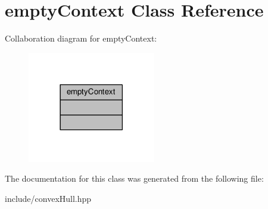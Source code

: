 \hypertarget{classempty_context}{}\section{empty\+Context Class Reference}
\label{classempty_context}


Collaboration diagram for empty\+Context\+:
\nopagebreak
\begin{figure}[H]
\begin{center}
\leavevmode
\includegraphics[width=158pt]{classempty_context__coll__graph}
\end{center}
\end{figure}


The documentation for this class was generated from the following file\+:\begin{DoxyCompactItemize}
\item 
include/convex\+Hull.\+hpp\end{DoxyCompactItemize}
